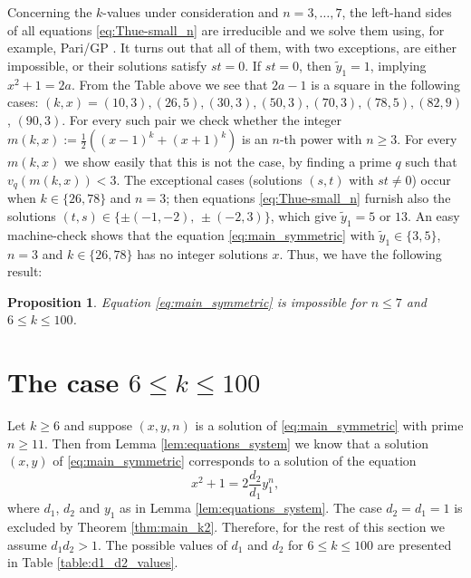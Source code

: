 \documentclass[12pt]{amsart}
\numberwithin{equation}{section}
\newtheorem{proposition}[lemma]{Proposition}
\theoremstyle{definition}
\theoremstyle{remark}
\newcommand{\ty}{\tilde{y}}
\begin{document}
Concerning the $k$-values under consideration and $n=3,\ldots,7$, the left-hand sides of all equations \eqref{eq:Thue-small_n} are irreducible and we solve them using, for example, Pari/GP \cite{pari24}. It turns out that all of them, with two exceptions, are either impossible, or their solutions satisfy $st=0$.
If $st=0$, then $\ty_1=1$, implying $x^2+1=2a$. From the Table above we see that
$2a-1$ is a square in the following cases: 
$(k,x)=(10,3), (26,5), (30,3), (50,3), (70,3), (78,5), (82,9)$, $(90,3)$.
For every such pair we check whether the integer
$m(k,x):=\frac{1}{2}\left((x-1)^k+(x+1)^k\right)$ is an $n$-th power with 
$n\ge 3$. For every $m(k,x)$ we show easily that this is not the case, 
by finding a prime $q$ such that $v_q(m(k,x))<3$.
The exceptional cases (solutions $(s,t)$ with $st\ne 0$) occur when 
$k\in\{26,78\}$ and $n=3$; then equations \eqref{eq:Thue-small_n} furnish also 
the solutions $(t,s)\in\{\pm (-1,-2),\,\pm (-2,3)\}$, which give $\ty_1=5$ or 
$13$. An easy machine-check shows that the equation \eqref{eq:main_symmetric} 
with $\ty_1\in\{3,5\}$, $n=3$ and $k\in\{26,78\}$ has no integer solutions $x$. 
Thus, we have the following result:
%
\begin{proposition}\label{prop:small_exponents}
Equation \eqref{eq:main_symmetric} is impossible for $n\leq 7$ and 
$6\leq k\leq 100$.
\end{proposition}
%
\section{The case $6\leq k\leq 100$}\label{sec:k_big_values}

Let $k\ge 6$ and suppose $(x,y,n)$ is a solution of \eqref{eq:main_symmetric} with prime $n\ge 11$. Then from Lemma \ref{lem:equations_system} we know that a solution $(x,y)$ of \eqref{eq:main_symmetric} corresponds to a solution of the equation
\begin{equation}\label{eq:d2_d1_y1n}
    x^2 + 1=2\frac{d_2}{d_1}y_1^n,
\end{equation}
where $d_1$, $d_2$ and $y_1$ as in Lemma \ref{lem:equations_system}. The case $d_2=d_1=1$ is excluded by Theorem \ref{thm:main_k2}. Therefore, for the rest of this section we assume $d_1d_2>1$. The possible values of $d_1$ and $d_2$ for $6\leq k\leq 100$ are presented in Table \ref{table:d1_d2_values}.
\end{document}

